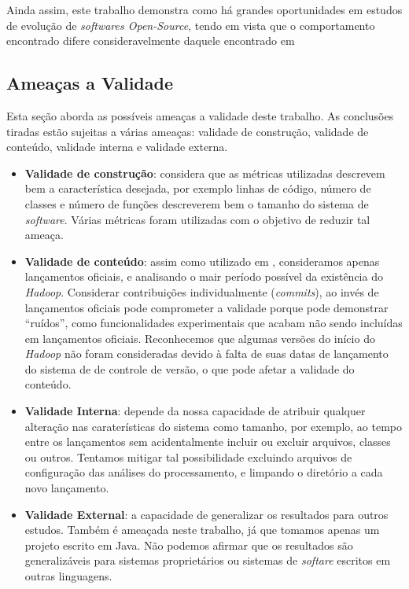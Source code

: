 Ainda assim, este trabalho demonstra como há grandes oportunidades em estudos de evolução de \textit{softwares Open-Source}, tendo em vista que o comportamento encontrado difere consideravelmente daquele encontrado em \cite{belady1976model,lehman1980programs,lehman1996laws}

\subsection{Ameaças a Validade} \label{subsec:threadstovalidity}
Esta seção aborda as possíveis ameaças a validade deste trabalho. As conclusões tiradas estão sujeitas a várias ameaças: validade de construção, validade de conteúdo, validade interna e validade externa.
\begin{itemize}
	\item \textbf{Validade de construção}: considera que as métricas utilizadas descrevem bem a característica desejada, por exemplo linhas de código, número de classes e número de funções descreverem bem o tamanho do sistema de \textit{software}. Várias métricas foram utilizadas com o objetivo de reduzir tal ameaça.
	\item \textbf{Validade de conteúdo}: assim como utilizado em \cite{neamtiu2013towards}, consideramos apenas lançamentos oficiais, e analisando o mair período possível da existência do \textit{Hadoop}. Considerar contribuições individualmente (\textit{commits}), ao invés de lançamentos oficiais pode comprometer a validade porque pode demonstrar ``ruídos'', como funcionalidades experimentais que acabam não sendo incluídas em lançamentos oficiais. Reconhecemos que algumas versões do início do \textit{Hadoop} não foram consideradas devido à falta de suas datas de lançamento do sistema de de controle de versão, o que pode afetar a validade do conteúdo.
	\item \textbf{Validade Interna}: depende da nossa capacidade de atribuir qualquer alteração nas caraterísticas do sistema como tamanho, por exemplo, ao tempo entre os lançamentos sem acidentalmente incluir ou excluir arquivos, classes ou outros. Tentamos mitigar tal possibilidade excluindo arquivos de configuração das análises do processamento, e limpando o diretório a cada novo lançamento.
	\item \textbf{Validade External}: a capacidade de generalizar os resultados para outros estudos. Também é ameaçada neste trabalho, já que tomamos apenas um projeto escrito em Java. Não podemos afirmar que os resultados são generalizáveis para sistemas proprietários ou sistemas de \textit{softare} escritos em outras linguagens.
\end{itemize}

